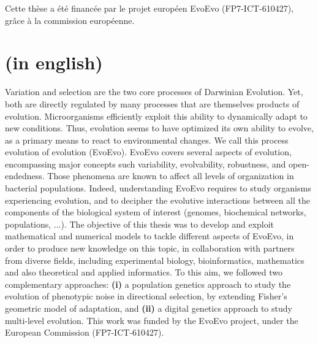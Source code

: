 Cette th\`ese a \'{e}t\'{e} financ\'{e}e par le projet europ\'{e}en EvoEvo (FP7-ICT-610427), gr\^{a}ce \`a la commission europ\'{e}enne.

\section*{(in english)}

Variation and selection are the two core processes of Darwinian Evolution. Yet, both are directly regulated by many processes that are themselves products of evolution. Microorganisms efficiently exploit this ability to dynamically adapt to new conditions. Thus, evolution seems to have optimized its own ability to evolve, as a primary means to react to environmental changes. We call this process evolution of evolution (EvoEvo). EvoEvo covers several aspects of evolution, encompassing major concepts such variability, evolvability, robustness, and open-endedness. Those phenomena are known to affect all levels of organization in bacterial populations. Indeed, understanding EvoEvo requires to study organisms experiencing evolution, and to decipher the evolutive interactions between all the components of the biological system of interest (genomes, biochemical networks, populations, ...).
The objective of this thesis was to develop and exploit mathematical and numerical models to tackle different aspects of EvoEvo, in order to produce new knowledge on this topic, in collaboration with partners from diverse fields, including experimental biology, bioinformatics, mathematics and also theoretical and applied informatics. To this aim, we followed two complementary approaches: \textbf{(i)} a population genetics approach to study the evolution of phenotypic noise in directional selection, by extending Fisher's geometric model of adaptation, and \textbf{(ii)} a digital genetics approach to study multi-level evolution. This work was funded by the EvoEvo project, under the European Commission (FP7-ICT-610427).

